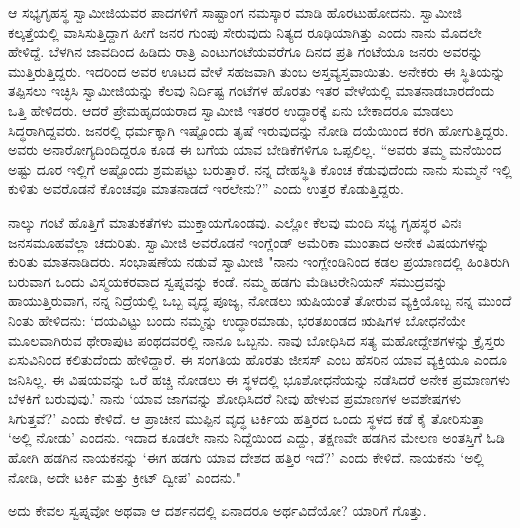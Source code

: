 ಆ ಸಭ್ಯಗೃಹಸ್ಥ ಸ್ವಾಮೀಜಿಯವರ ಪಾದಗಳಿಗೆ ಸಾಷ್ಟಾಂಗ ನಮಸ್ಕಾರ ಮಾಡಿ ಹೊರಟುಹೋದನು. ಸ್ವಾಮೀಜಿ ಕಲ್ಕತ್ತೆಯಲ್ಲಿ ವಾಸಿಸುತ್ತಿದ್ದಾಗ ಹೀಗೆ ಜನರ ಗುಂಪು ಸೇರುವುದು ನಿತ್ಯದ ರೂಢಿಯಾಗಿತ್ತು ಎಂದು ನಾನು ಮೊದಲೇ ಹೇಳಿದ್ದೆ. ಬೆಳಗಿನ ಜಾವದಿಂದ ಹಿಡಿದು ರಾತ್ರಿ ಎಂಟುಗಂಟೆಯವರೆಗೂ ದಿನದ ಪ್ರತಿ ಗಂಟೆಯೂ ಜನರು ಅವರನ್ನು ಮುತ್ತಿರುತ್ತಿದ್ದರು. ಇದರಿಂದ ಅವರ ಊಟದ ವೇಳೆ ಸಹಜವಾಗಿ ತುಂಬ ಅಸ್ತವ್ಯಸ್ತವಾಯಿತು. ಅನೇಕರು ಈ ಸ್ಥಿತಿಯನ್ನು ತಪ್ಪಿಸಲು ಇಚ್ಛಿಸಿ ಸ್ವಾಮೀಜಿಯನ್ನು ಕೆಲವು ನಿರ್ದಿಷ್ಟ ಗಂಟೆಗಳ ಹೊರತು ಇತರ ವೇಳೆಯಲ್ಲಿ ಮಾತನಾಡಬಾರದೆಂದು ಒತ್ತಿ ಹೇಳಿದರು. ಆದರೆ ಪ್ರೇಮಹೃದಯರಾದ ಸ್ವಾಮೀಜಿ ಇತರರ ಉದ್ಧಾರಕ್ಕೆ ಏನು ಬೇಕಾದರೂ ಮಾಡಲು ಸಿದ್ಧರಾಗಿದ್ದವರು. ಜನರಲ್ಲಿ ಧರ್ಮಕ್ಕಾಗಿ ಇಷ್ಟೊಂದು ತೃಷೆ ಇರುವುದನ್ನು ನೋಡಿ ದಯೆಯಿಂದ ಕರಗಿ ಹೋಗುತ್ತಿದ್ದರು. ಅವರು ಅನಾರೋಗ್ಯದಿಂದಿದ್ದರೂ ಕೂಡ ಈ ಬಗೆಯ ಯಾವ ಬೇಡಿಕೆಗಳಿಗೂ ಒಪ್ಪಲಿಲ್ಲ. “ಅವರು ತಮ್ಮ ಮನೆಯಿಂದ ಅಷ್ಟು ದೂರ ಇಲ್ಲಿಗೆ ಅಷ್ಟೊಂದು ಶ್ರಮಪಟ್ಟು ಬರುತ್ತಾರೆ. ನನ್ನ ದೇಹಸ್ಥಿತಿ ಕೊಂಚ ಕೆಡುವುದೆಂದು ನಾನು ಸುಮ್ಮನೆ ಇಲ್ಲಿ ಕುಳಿತು ಅವರೊಡನೆ ಕೊಂಚವೂ ಮಾತನಾಡದೆ ಇರಲೇನು?” ಎಂದು ಉತ್ತರ ಕೊಡುತ್ತಿದ್ದರು.

ನಾಲ್ಕು ಗಂಟೆ ಹೊತ್ತಿಗೆ ಮಾತುಕತೆಗಳು ಮುಕ್ತಾಯಗೊಂಡವು. ಎಲ್ಲೋ ಕೆಲವು ಮಂದಿ ಸಭ್ಯ ಗೃಹಸ್ಥರ ವಿನಃ ಜನಸಮೂಹವೆಲ್ಲಾ ಚದುರಿತು. ಸ್ವಾಮೀಜಿ ಅವರೊಡನೆ ಇಂಗ್ಲೆಂಡ್ ಅಮೆರಿಕಾ ಮುಂತಾದ ಅನೇಕ ವಿಷಯಗಳನ್ನು ಕುರಿತು ಮಾತನಾಡಿದರು. ಸಂಭಾಷಣೆಯ ನಡುವೆ ಸ್ವಾಮೀಜಿ "ನಾನು ಇಂಗ್ಲೇಂಡಿನಿಂದ ಕಡಲ ಪ್ರಯಾಣದಲ್ಲಿ ಹಿಂತಿರುಗಿ ಬರುವಾಗ ಒಂದು ವಿಸ್ಮಯಕರವಾದ ಸ್ವಪ್ನವನ್ನು ಕಂಡೆ. ನಮ್ಮ ಹಡಗು ಮೆಡಿಟರೇನಿಯನ್ ಸಮುದ್ರವನ್ನು ಹಾಯುತ್ತಿರುವಾಗ, ನನ್ನ ನಿದ್ರೆಯಲ್ಲಿ ಒಬ್ಬ ವೃದ್ಧ ಪೂಜ್ಯ, ನೋಡಲು ಋಷಿಯಂತೆ ತೋರುವ ವ್ಯಕ್ತಿಯೊಬ್ಬ ನನ್ನ ಮುಂದೆ ನಿಂತು ಹೇಳಿದನು: ‘ದಯವಿಟ್ಟು ಬಂದು ನಮ್ಮನ್ನು ಉದ್ಧಾರಮಾಡು, ಭರತಖಂಡದ ಋಷಿಗಳ ಬೋಧನೆಯೇ ಮೂಲವಾಗಿರುವ ಥೇರಾಪುಟ ಪಂಥದವರಲ್ಲಿ ನಾನೂ ಒಬ್ಬನು. ನಾವು ಬೋಧಿಸಿದ ಸತ್ಯ ಮಹೋದ್ದೇಶಗಳನ್ನು ಕ್ರೈಸ್ತರು ಏಸುವಿನಿಂದ ಕಲಿತುದೆಂದು ಹೇಳಿದ್ದಾರೆ. ಈ ಸಂಗತಿಯ ಹೊರತು ಜೀಸಸ್ ಎಂಬ ಹೆಸರಿನ ಯಾವ ವ್ಯಕ್ತಿಯೂ ಎಂದೂ ಜನಿಸಿಲ್ಲ. ಈ ವಿಷಯವನ್ನು ಒರೆ ಹಚ್ಚಿ ನೋಡಲು ಈ ಸ್ಥಳದಲ್ಲಿ ಭೂಶೋಧನೆಯನ್ನು ನಡೆಸಿದರೆ ಅನೇಕ ಪ್ರಮಾಣಗಳು ಬೆಳಕಿಗೆ ಬರುವುವು.’ ನಾನು ‘ಯಾವ ಜಾಗವನ್ನು ಶೋಧಿಸಿದರೆ ನೀವು ಹೇಳುವ ಪ್ರಮಾಣಗಳ ಅವಶೇಷಗಳು ಸಿಗುತ್ತವೆ?’ ಎಂದು ಕೇಳಿದೆ. ಆ ಪ್ರಾಚೀನ ಮುಪ್ಪಿನ ವೃದ್ಧ ಟರ್ಕಿಯ ಹತ್ತಿರದ ಒಂದು ಸ್ಥಳದ ಕಡೆ ಕೈ ತೋರಿಸುತ್ತಾ ‘ಅಲ್ಲಿ ನೋಡು’ ಎಂದನು. ಇದಾದ ಕೂಡಲೇ ನಾನು ನಿದ್ದೆಯಿಂದ ಎದ್ದು, ತಕ್ಷಣವೇ ಹಡಗಿನ ಮೇಲಣ ಅಂತಸ್ತಿಗೆ ಓಡಿ ಹೋಗಿ ಹಡಗಿನ ನಾಯಕನನ್ನು ‘ಈಗ ಹಡಗು ಯಾವ ದೇಶದ ಹತ್ತಿರ ಇದೆ?’ ಎಂದು ಕೇಳಿದೆ. ನಾಯಕನು ‘ಅಲ್ಲಿ ನೋಡಿ, ಅದೇ ಟರ್ಕಿ ಮತ್ತು ಕ್ರೀಟ್ ದ್ವೀಪ’ ಎಂದನು."

ಅದು ಕೇವಲ ಸ್ವಪ್ನವೋ ಅಥವಾ ಆ ದರ್ಶನದಲ್ಲಿ ಏನಾದರೂ ಅರ್ಥವಿದೆಯೋ? ಯಾರಿಗೆ ಗೊತ್ತು.

